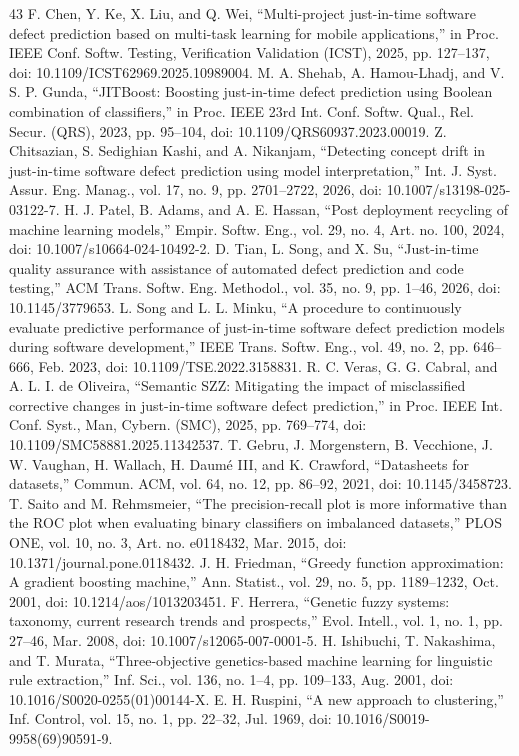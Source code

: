 \begin{thebibliography}{43}
 F. Chen, Y. Ke, X. Liu, and Q. Wei, ``Multi-project just-in-time software defect prediction based on multi-task learning for mobile applications,'' in Proc. IEEE Conf. Softw. Testing, Verification Validation (ICST), 2025, pp. 127--137, doi: \mbox{10.1109/ICST62969.2025.10989004}.
 M. A. Shehab, A. Hamou-Lhadj, and V. S. P. Gunda, ``JITBoost: Boosting just-in-time defect prediction using Boolean combination of classifiers,'' in Proc. IEEE 23rd Int. Conf. Softw. Qual., Rel. Secur. (QRS), 2023, pp. 95--104, doi: \mbox{10.1109/QRS60937.2023.00019}.
 Z. Chitsazian, S. Sedighian Kashi, and A. Nikanjam, ``Detecting concept drift in just-in-time software defect prediction using model interpretation,'' Int. J. Syst. Assur. Eng. Manag., vol. 17, no. 9, pp. 2701--2722, 2026, doi: \mbox{10.1007/s13198-025-03122-7}.
 H. J. Patel, B. Adams, and A. E. Hassan, ``Post deployment recycling of machine learning models,'' Empir. Softw. Eng., vol. 29, no. 4, Art. no. 100, 2024, doi: \mbox{10.1007/s10664-024-10492-2}.
 D. Tian, L. Song, and X. Su, ``Just-in-time quality assurance with assistance of automated defect prediction and code testing,'' ACM Trans. Softw. Eng. Methodol., vol. 35, no. 9, pp. 1--46, 2026, doi: \mbox{10.1145/3779653}.
 L. Song and L. L. Minku, ``A procedure to continuously evaluate predictive performance of just-in-time software defect prediction models during software development,'' IEEE Trans. Softw. Eng., vol. 49, no. 2, pp. 646--666, Feb. 2023, doi: \mbox{10.1109/TSE.2022.3158831}.
 R. C. Veras, G. G. Cabral, and A. L. I. de Oliveira, ``Semantic SZZ: Mitigating the impact of misclassified corrective changes in just-in-time software defect prediction,'' in Proc. IEEE Int. Conf. Syst., Man, Cybern. (SMC), 2025, pp. 769--774, doi: \mbox{10.1109/SMC58881.2025.11342537}.
 T. Gebru, J. Morgenstern, B. Vecchione, J. W. Vaughan, H. Wallach, H. Daum\'e III, and K. Crawford, ``Datasheets for datasets,'' Commun. ACM, vol. 64, no. 12, pp. 86--92, 2021, doi: 10.1145/3458723.
 T. Saito and M. Rehmsmeier, ``The precision-recall plot is more informative than the ROC plot when evaluating binary classifiers on imbalanced datasets,'' PLOS ONE, vol. 10, no. 3, Art. no. e0118432, Mar. 2015, doi: \mbox{10.1371/journal.pone.0118432}.
 J. H. Friedman, ``Greedy function approximation: A gradient boosting machine,'' Ann. Statist., vol. 29, no. 5, pp. 1189--1232, Oct. 2001, doi: \mbox{10.1214/aos/1013203451}.
 F. Herrera, ``Genetic fuzzy systems: taxonomy, current research trends and prospects,'' Evol. Intell., vol. 1, no. 1, pp. 27--46, Mar. 2008, doi: \mbox{10.1007/s12065-007-0001-5}.
 H. Ishibuchi, T. Nakashima, and T. Murata, ``Three-objective genetics-based machine learning for linguistic rule extraction,'' Inf. Sci., vol. 136, no. 1--4, pp. 109--133, Aug. 2001, doi: \mbox{10.1016/S0020-0255(01)00144-X}.
 E. H. Ruspini, ``A new approach to clustering,'' Inf. Control, vol. 15, no. 1, pp. 22--32, Jul. 1969, doi: \mbox{10.1016/S0019-9958(69)90591-9}.
\end{thebibliography}
